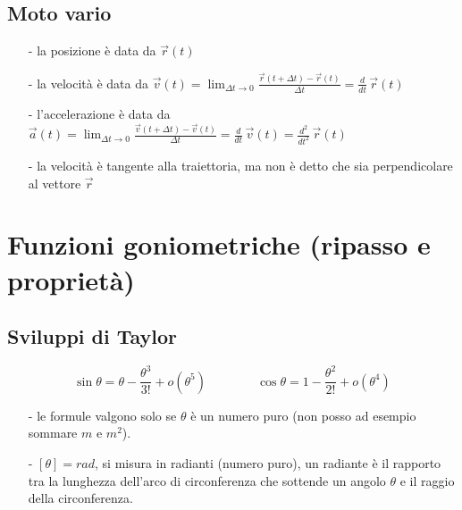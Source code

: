\documentclass[a4paper]{article}
\newcommand\dt{\frac{d}{dt}\,}
\newcommand\dts{\frac{d^2}{dt^2}\,}
\begin{document}
\subsection{Moto vario}
\begin{itemize}[topsep=3pt, itemsep=0pt]
	\item[-] la posizione è data da \(\vec{r}(t)\)
	\item[-] la velocità è data da \(\displaystyle \vec{v}(t) = \lim_{\Delta t \to 0} \frac{\vec{r}(t+\Delta t) - \vec{r}(t)}{\Delta t} = \dt \vec{r}(t)\)
	\item[-] l'accelerazione è data da \(\displaystyle \vec{a}(t) = \lim_{\Delta t \to 0} \frac{\vec{v}(t+\Delta t) - \vec{v}(t)}{\Delta t} = \dt \vec{v}(t) = \dts \vec{r}(t)\)
	\item[-] la velocità è tangente alla traiettoria, ma non è detto che sia perpendicolare al vettore \(\vec{r}\)
\end{itemize}

\newpage


\section{Funzioni goniometriche (ripasso e proprietà)}
\subsection{Sviluppi di Taylor}
\[\sin \theta = \theta - \frac{\theta^3}{3!} + o(\theta^5) \qquad \qquad \cos \theta = 1 - \frac{\theta^2}{2!} + o(\theta^4)\]
\begin{itemize}[topsep=3pt, itemsep=0pt]
	\item[-] le formule valgono solo se \(\theta\) è un numero puro (non posso ad esempio sommare \(m\) e \(m^2\)).
	\item[-] \(\left[\theta\right] = rad\), si misura in radianti (numero puro), un radiante è il rapporto tra la lunghezza dell'arco
	di circonferenza che sottende un angolo \(\theta\) e il raggio della circonferenza.
\end{itemize}
\end{document}
